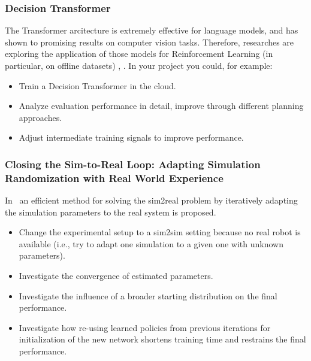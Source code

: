 \documentclass[a4paper]{article}
\begin{document}
\subsubsection{Decision Transformer}
The Transformer arcitecture is extremely effective for language models, and has shown to promising results on computer vision tasks. 
Therefore, researches are exploring the application of those models for Reinforcement Learning (in particular, on offline datasets) \cite{DecisionTransformer2021}, \cite{OneBigSequence2021}. In your project you could, for example:
\begin{itemize}
  \item Train a Decision Transformer in the cloud.
  \item Analyze evaluation performance in detail, improve through different planning approaches.
  \item Adjust intermediate training signals to improve performance.
\end{itemize}


\subsubsection{Closing the Sim-to-Real Loop: Adapting Simulation Randomization with Real World Experience}
In~\cite{Chebotar2018} an efficient method for solving the sim2real problem by iteratively adapting the simulation parameters to the real system is proposed.
\begin{itemize}
  \item Change the experimental setup to a sim2sim setting because no real robot is available (i.e., try to adapt one simulation to a given one with unknown parameters).
  \item Investigate the convergence of estimated parameters.
  \item Investigate the influence of a broader starting distribution on the final performance.
  \item Investigate how re-using learned policies from previous iterations for initialization of the new network shortens training time and restrains the final performance.
\end{itemize}
\end{document}
